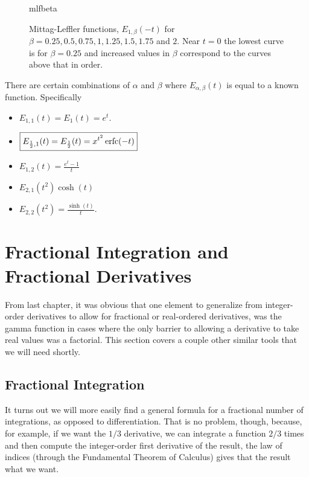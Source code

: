     \begin{figure}
      \centering
      {mlfbeta}
      \caption{Mittag-Leffler functions, $E_{1, \beta}(-t)$ for $\beta = 0.25, 0.5, 0.75, 1, 1.25, 1.5, 1.75$ and $2$. Near $t=0$ the lowest curve is for $\beta = 0.25$ and increased values in $\beta$ correspond to the curves above that in order.}
      \label{fig:mlfbeta}
    \end{figure}

    There are certain combinations of $\alpha$ and $\beta$ where $E_{\alpha,\beta}(t)$ is equal to a known function. Specifically
    \begin{itemize}
      \item $\boxed{ E_{1,1}(t) = E_1(t) = e^t. }$
      \item $\boxed{ E_{\frac{1}{2},1} (t) = E_\frac{1}{2}(t) = x^{t^2} \operatorname{erfc}(-t)  }$
      \item $\boxed{ E_{1,2}(t) = \frac{e^t - 1}{t}  }$
      \item $\boxed{ E_{2,1}(t^2) \cosh(t) }$
      \item $\boxed{ E_{2,2 }(t^2) = \frac{\sinh(t)}{t}. }$
    \end{itemize}


    \section{Fractional Integration and Fractional Derivatives}

    From last chapter, it was obvious that one element to generalize from integer-order derivatives to allow for fractional or real-ordered derivatives, was the gamma function in cases where the only barrier to allowing a derivative to take real values was a factorial. This section covers a couple other similar tools that we will need shortly.

    \subsection{Fractional Integration}

    It turns out we will more easily find a general formula for a fractional number of integrations, as opposed to differentiation. That is no problem, though, because, for example, if we want the $1/3$ derivative, we can integrate a function $2/3$ times and then compute the integer-order first derivative of the result, the law of indices (through the Fundamental Theorem of Calculus) gives that the result what we want. 

